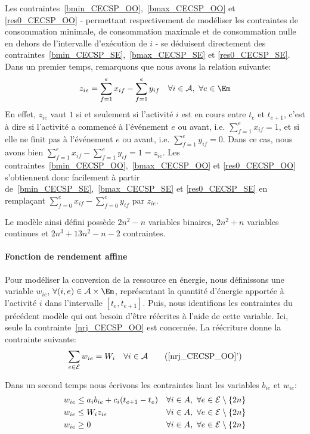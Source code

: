 Les contraintes~\eqref{bmin_CECSP_OO},~\eqref{bmax_CECSP_OO} et
\eqref{res0_CECSP_OO} - permettant respectivement de modéliser les
contraintes de consommation minimale, de consommation maximale et de
consommation nulle en dehors de l'intervalle d'exécution de $i$ - se
déduisent directement des
contraintes~\eqref{bmin_CECSP_SE},~\eqref{bmax_CECSP_SE} et
\eqref{res0_CECSP_SE}. Dans un premier temps, remarquons que nous
avons la relation suivante:
\begin{equation}
\label{SEversOO}
z_{ie} = \sum_{f=1}^e x_{if} -  \sum_{f=1}^e y_{if} \quad \forall i
\in \A,\ \forall e\in \Em
\end{equation}
En effet, $z_{ie}$ vaut $1$ si et seulement si l'activité $i$ est en
cours entre $t_e$ et $t_{e+1}$, c'est à dire si l'activité a commencé à
l'événement $e$ ou avant, i.e. $\sum_{f=1}^ex_{if}=1$, et si elle
ne finit pas à l'événement $e$ ou avant, i.e. $\sum_{f=1}^ey_{if}=
0$. Dans ce cas, nous avons bien $\sum_{f=1}^ex_{if} -
\sum_{f=1}^ey_{if}= 1 = z_{ie}$. Les
contraintes~\eqref{bmin_CECSP_OO},~\eqref{bmax_CECSP_OO} et
\eqref{res0_CECSP_OO} s'obtiennent donc facilement à partir
de~\eqref{bmin_CECSP_SE},~\eqref{bmax_CECSP_SE} et
\eqref{res0_CECSP_SE} en remplaçant $\sum_{f=0}^{e}
x_{if}-\sum_{f=0}^{e}y_{if}$ par $z_{ie}$.


Le modèle ainsi défini possède $2n^2-n$ variables binaires, $2n^2+n$
variables continues et $2n^3+13n^2-n-2$ contraintes.    

\paragraph{Fonction de rendement affine}

Pour modéliser la conversion de la ressource en énergie, nous
définissons une variable $w_{ie}$, $\forall (i,e) \in \A \times \Em$,
représentant la quantité d'énergie 
apportée à l'activité $i$ dans l'intervalle $[t_e,t_{e+1}]$. Puis,
nous identifions les contraintes du précédent modèle qui ont besoin
d'être réécrites à l'aide de cette variable. Ici, seule la
contrainte~\eqref{nrj_CECSP_OO} est concernée. La réécriture donne la
contrainte suivante:
\begin{equation}
\sum_{e\in \E} w_{ie}=W_i \quad \forall i \in \A
\tag{\ref{nrj_CECSP_OO}'}
\end{equation}

Dans un second temps nous écrivons les contraintes liant les variables
$b_{ie}$ et $w_{ie}$:
\begin{align}
  &w_{ie} \le a_ib_{ie}+c_i(t_{e+1}-t_e) & & \forall i \in A,\ \forall
  e \in {\cal E} \setminus\{2n\} \label{conv1_CECSP_OO}\\
  &w_{ie} \le W_i z_{ie} & & \forall i \in A,\ \forall e \in {\cal E}\setminus\{2n\} \label{conv2_CECSP_OO}\\
  & w_{ie} \ge 0 & & \forall i \in A,\ \forall e \in {\cal E}\setminus\{2n\}
  \label{Bw_CECSP_OO}
\end{align}

